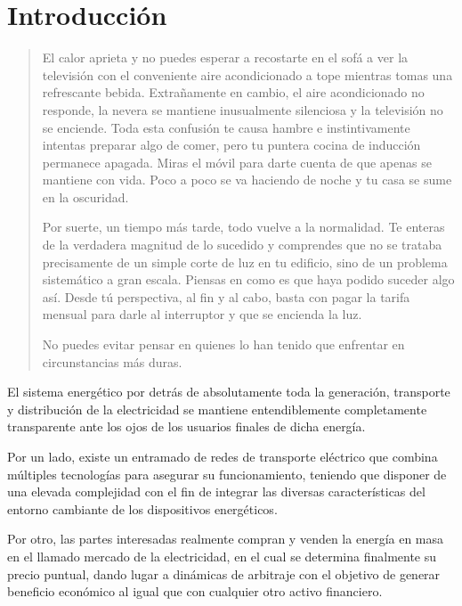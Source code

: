 \cleardoublepage

\chapter{Introducción}
\label{makereference1}

\begin{quotation}

El calor aprieta y no puedes esperar a recostarte en el sofá a ver la televisión con el conveniente aire acondicionado a tope mientras tomas una refrescante bebida. Extrañamente en cambio, el aire acondicionado no responde, la nevera se mantiene inusualmente silenciosa y la televisión no se enciende. Toda esta confusión te causa hambre e instintivamente intentas preparar algo de comer, pero tu puntera cocina de inducción permanece apagada. Miras el móvil para darte cuenta de que apenas se mantiene con vida. Poco a poco se va haciendo de noche y tu casa se sume en la oscuridad.

Por suerte, un tiempo más tarde, todo vuelve a la normalidad. Te enteras de la verdadera magnitud de lo sucedido y comprendes que no se trataba precisamente de un simple corte de luz en tu edificio, sino de un problema sistemático a gran escala. Piensas en como es que haya podido suceder algo así. Desde tú perspectiva, al fin y al cabo, basta con pagar la tarifa mensual para darle al interruptor y que se encienda la luz.

No puedes evitar pensar en quienes lo han tenido que enfrentar en circunstancias más duras.

\end{quotation}

El sistema energético por detrás de absolutamente toda la generación, transporte y distribución de la electricidad se mantiene entendiblemente completamente transparente ante los ojos de los usuarios finales de dicha energía.

Por un lado, existe un entramado de redes de transporte eléctrico que combina múltiples tecnologías para asegurar su funcionamiento, teniendo que disponer de una elevada complejidad con el fin de integrar las diversas características del entorno cambiante de los dispositivos energéticos.

Por otro, las partes interesadas realmente compran y venden la energía en masa en el llamado mercado de la electricidad, en el cual se determina finalmente su precio puntual, dando lugar a dinámicas de arbitraje con el objetivo de generar beneficio económico al igual que con cualquier otro activo financiero.

